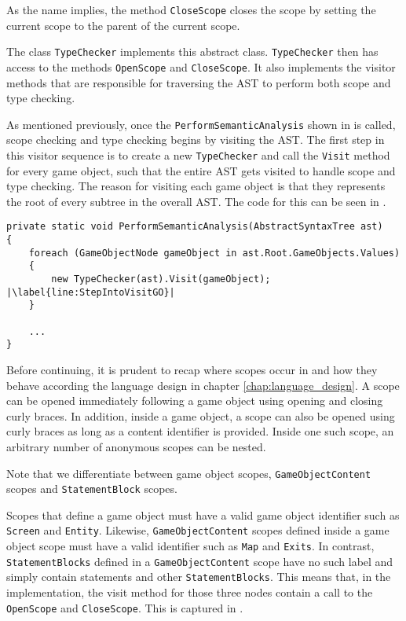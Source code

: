 As the name implies, the method \texttt{CloseScope} closes the scope by setting the current scope to the parent of the current scope. 


The class \texttt{TypeChecker} implements this abstract class. \texttt{TypeChecker} then has access to the methods \texttt{OpenScope} and \texttt{CloseScope}. It also implements the visitor methods that are responsible for traversing the AST to perform both scope and type checking.

As mentioned previously, once the \texttt{PerformSemanticAnalysis} shown in  is called, scope checking and type checking begins by visiting the AST. The first step in this visitor sequence is to create a new \texttt{TypeChecker} and call the \texttt{Visit} method for every game object, such that the entire AST gets visited to handle scope and type checking. The reason for visiting each game object is that they represents the root of every subtree in the overall AST. The code for this can be seen in .

\begin{lstlisting}[language=CSharp, caption={A TypeChecker object is instantiated for every \texttt{GameObjectNode}.}, label={lst:TypeCheckEachGO},escapechar=|]
private static void PerformSemanticAnalysis(AbstractSyntaxTree ast)
{
    foreach (GameObjectNode gameObject in ast.Root.GameObjects.Values)
    {
        new TypeChecker(ast).Visit(gameObject); |\label{line:StepIntoVisitGO}|
    }

    ...
}
\end{lstlisting}

Before continuing, it is prudent to recap where scopes occur in \dazel{} and how they behave according the language design in chapter \ref{chap:language_design}. A scope can be opened immediately following a game object using opening and closing curly braces. In addition, inside a game object, a scope can also be opened using curly braces as long as a content identifier is provided. Inside one such scope, an arbitrary number of anonymous scopes can be nested. 

Note that we differentiate between game object scopes, \texttt{GameObjectContent} scopes and \texttt{StatementBlock} scopes.

Scopes that define a game object must have a valid game object identifier such as \texttt{Screen} and \texttt{Entity}. 
Likewise, \texttt{GameObjectContent} scopes defined inside a game object scope must have a valid identifier such as \texttt{Map} and \texttt{Exits}. In contrast, \texttt{StatementBlocks} defined in a \texttt{GameObjectContent} scope have no such label and simply contain statements and other \texttt{StatementBlocks}. 
This means that, in the implementation, the visit method for those three nodes contain a call to the \texttt{OpenScope} and \texttt{CloseScope}. This is captured in .

